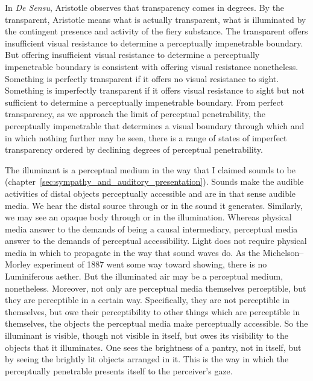 In \emph{De Sensu}, Aristotle observes that transparency comes in degrees. By the transparent, Aristotle means what is actually transparent, what is illuminated by the contingent presence and activity of the fiery substance. The transparent offers insufficient visual resistance to determine a perceptually impenetrable boundary. But offering insufficient visual resistance to determine a perceptually impenetrable boundary is consistent with offering visual resistance nonetheless. Something is perfectly transparent if it offers no visual resistance to sight. Something is imperfectly transparent if it offers visual resistance to sight but not sufficient to determine a perceptually impenetrable boundary. From perfect transparency, as we approach the limit of perceptual penetrability, the perceptually impenetrable that determines a visual boundary through which and in which nothing further may be seen, there is a range of states of imperfect transparency ordered by declining degrees of perceptual penetrability. 

The illuminant is a perceptual medium in the way that I claimed sounds to be (chapter~\ref{sec:sympathy_and_auditory_presentation}). Sounds make the audible activities of distal objects perceptually accessible and are in that sense audible media. We hear the distal source through or in the sound it generates. Similarly, we may see an opaque body through or in the illumination. Whereas physical media answer to the demands of being a causal intermediary, perceptual media answer to the demands of perceptual accessibility. Light does not require physical media in which to propagate in the way that sound waves do. As the Michelson–Morley experiment of 1887 went some way toward showing, there is no Luminiferous aether. But the illuminated air may be a perceptual medium, nonetheless. Moreover, not only are perceptual media themselves perceptible, but they are perceptible in a certain way. Specifically, they are not perceptible in themselves, but owe their perceptibility to other things which are perceptible in themselves, the objects the perceptual media make perceptually accessible. So the illuminant is visible, though not visible in itself, but owes its visibility to the objects that it illuminates. One sees the brightness of a pantry, not in itself, but by seeing the brightly lit objects arranged in it. This is the way in which the perceptually penetrable presents itself to the perceiver's gaze.


